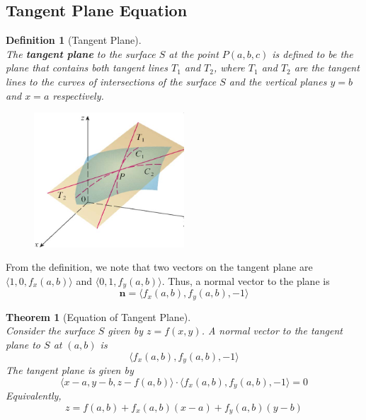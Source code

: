 \documentclass[12pt]{article}
\newtheorem{definition}{Definition}[section]
\newtheorem{theorem}{Theorem}[section]
\theoremstyle{definition}
\newcommand\ve[1]{\mathbf{#1}}
\begin{document}
\subsection{Tangent Plane Equation}
\begin{definition}[Tangent Plane]
\hfill\\\normalfont The \textbf{tangent plane} to the surface $S$ at the point $P(a,b,c)$ is defined to be the plane that contains both tangent lines $T_1$ and $T_2$, where $T_1$ and $T_2$ are the tangent lines to the curves of intersections of the surface $S$ and the vertical planes $y=b$ and $x=a$ respectively.
\begin{figure}[h]
\centering
\includegraphics[width = 0.5\textwidth]{3_1.jpg}
\end{figure}
\end{definition}
From the definition, we note that two vectors on the tangent plane are $\langle 1,0,f_x(a,b)\rangle$ and $\langle 0,1,f_y(a,b)\rangle$. Thus, a normal vector to the plane is
\[
\ve{n}=\langle f_x(a,b),f_y(a,b),-1\rangle
\]
\begin{theorem}[Equation of Tangent Plane]
\hfill\\\normalfont Consider the surface $S$ given by $z=f(x,y)$. A normal vector to the tangent plane to $S$ at $(a,b)$ is
\[\langle f_x(a,b),f_y(a,b),-1\rangle\]
The tangent plane is given by
\[
\langle x-a,y-b,z-f(a,b)\rangle \cdot \langle f_x(a,b),f_y(a,b),-1\rangle = 0
\]
Equivalently,
\[
z=f(a,b)+f_x(a,b)(x-a)+f_y(a,b)(y-b)
\]
\end{theorem}
\end{document}
